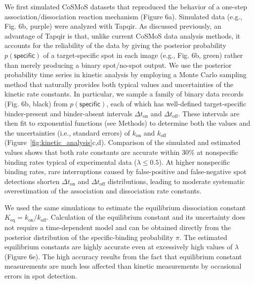 We first simulated CoSMoS datasets that reproduced the behavior of a one-step association/dissociation reaction mechanism (Figure 6a). Simulated data (e.g., Fig. 6b, purple) were analyzed with Tapqir.   As discussed previously, an advantage of Tapqir is that, unlike current CoSMoS data analysis methods, it accounts for the reliability of the data by giving the posterior probability $p(\mathsf{specific})$ of a target-specific spot in each image (e.g., Fig. 6b, green) rather than merely producing a binary spot/no-spot output.  We use the posterior probability time series in kinetic analysis by employing a Monte Carlo sampling method that naturally provides both typical values and uncertainties of the kinetic rate constants.  In particular, we sample a family of binary data records (Fig. 6b, black) from $p(\mathsf{specific})$, each of which has well-defined target-specific binder-present and binder-absent intervals $\Delta t_\mathrm{on}$ and $\Delta t_\mathrm{off}$. These intervals are then fit to exponential functions (see Methods) to determine both the values and the uncertainties (i.e., standard errors) of $k_\mathrm{on}$ and $k_\mathrm{off}$ (Figure~\ref{fig:kinetic_analysis}c,d). Comparison of the simulated and estimated values shows that both rate constants are accurate within 30\% at nonspecific binding rates typical of experimental data ($\lambda \leq 0.5$). At higher nonspecific binding rates, rare interruptions caused by false-positive and false-negative spot detections shorten $\Delta t_\mathrm{on}$ and $\Delta t_\mathrm{off}$ distributions, leading to moderate systematic overestimation of the association and dissociation rate constants.

We used the same simulations to estimate the equilibrium dissociation constant $K_\mathrm{eq} = k_\mathrm{on}/k_\mathrm{off}$.  Calculation of the equilibrium constant and its uncertainty does not require a time-dependent model and can be obtained directly from the posterior distribution of the specific-binding probability $\pi$. The estimated equilibrium constants are highly accurate even at excessively  high values of $\lambda$ (Figure 6e).  The high accuracy results from the fact that equilibrium constant measurements are much less affected than kinetic measurements by occasional errors in spot detection. 

